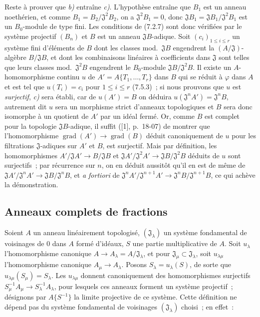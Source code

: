 Reste à prouver que \emph{b)} entraîne \emph{c)}. L'hypothèse entraîne que $B_1$ est un
anneau noethérien, et comme $B_1=B_2/\mathfrak J^2B_2$, on a
$\mathfrak J^2B_1=0$, donc
$\mathfrak JB_1=\mathfrak JB_1/\mathfrak J^2B_1$ est un $B_0$-module de type
fini. Les conditions de (7.2.7) sont donc vérifiées par le système projectif
$(B_n)$ et $B$ est un anneau $\mathfrak JB$-adique. Soit
$(c_i)_{1\leq i\leq r}$ un système fini d'éléments de $B$ dont les classes
mod.~$\mathfrak JB$ engendrent la $(A/\mathfrak J)$-algèbre
$B/\mathfrak JB$, et dont les combinaisons linéaires à coefficients dans
$\mathfrak J$ sont telles que leurs classes mod.~$\mathfrak J^2B$ engendrent
le $B_0$-module $\mathfrak JB/\mathfrak J^2B$. Il existe un
$A$-homomorphisme continu $u$ de $A'=A\{T_1,\ldots,T_r\}$ dans $B$ qui se
réduit à $\varphi$ dans $A$ et est tel que $u(T_i)=c_i$ pour $1\leq i\leq r$
(7.5.3)~; si nous prouvons que $u$ est \emph{surjectif}, \emph{c)} sera établi, car de
$u(A')=B$ on déduira $u(\mathfrak J^nA')=\mathfrak J^nB$, autrement dit $u$
sera un morphisme strict d'anneaux topologiques et $B$ sera donc isomorphe à un
quotient de $A'$ par un idéal fermé. Or, comme $B$ est complet pour la topologie
$\mathfrak JB$-adique, il suffit ([1], p.~18-07) de montrer que
l'homomorphisme $\operatorname{grad}(A')\to\operatorname{grad}(B)$ déduit
canoniquement de $u$ pour les filtrations $\mathfrak J$-adiques sur $A'$ et
$B$, est surjectif. Mais par définition, les homomorphismes
$A'/\mathfrak JA'\to B/\mathfrak JB$ et
$\mathfrak JA'/\mathfrak J^2A'\to\mathfrak JB/\mathfrak J^2B$ déduits de $u$
sont surjectifs~; par récurrence sur $n$, on en déduit aussitôt qu'il en est de
même de $\mathfrak JA'/\mathfrak J^nA'\to\mathfrak JB/\mathfrak J^nB$, et
\emph{a fortiori} de
$\mathfrak J^nA'/\mathfrak J^{n+1}A'\to
\mathfrak J^nB/\mathfrak J^{n+1}B$, ce qui achève la démonstration.

\subsection{Anneaux complets de fractions}
\label{subsection:0.7.6-fr}

\begin{env}[7.6.1]
\label{0.7.6.1-fr}
Soient $A$ un anneau linéairement topologisé, $(\mathfrak J_\lambda)$ un
système fondamental de voisinages de 0 dans $A$ formé d'idéaux, $S$ une partie
multiplicative de $A$. Soit $u_\lambda$ l'homomorphisme canonique
$A\to A_\lambda=A/\mathfrak J_\lambda$, et pour
$\mathfrak J_\mu\subset\mathfrak J_\lambda$, soit $u_{\lambda\mu}$
l'homomorphisme canonique $A_\mu\to A_\lambda$. Posons
$S_\lambda=u_\lambda(S)$, de sorte que
$u_{\lambda\mu}(S_\mu)=S_\lambda$. Les $u_{\lambda\mu}$ donnent
canoniquement des homomorphismes surjectifs
$S_\mu^{-1}A_\mu\to S_\lambda^{-1}A_\lambda$, pour lesquels ces anneaux
forment un système projectif~; désignons par $A\{S^{-1}\}$ la limite
projective de ce système. Cette définition ne dépend pas du système fondamental
de voisinages $(\mathfrak J_\lambda)$ choisi~; en effet~:
\end{env}

